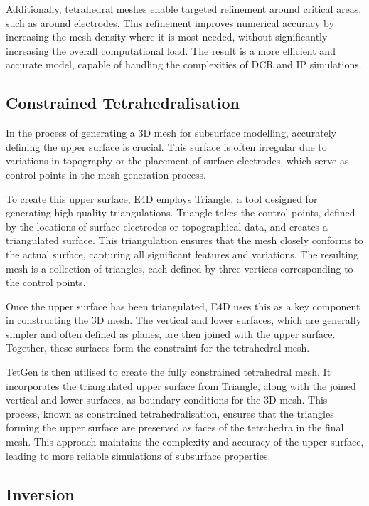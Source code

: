 \documentclass[a4paper,12pt]{article}
\begin{document}
Additionally, tetrahedral meshes enable targeted refinement around critical areas, such as around electrodes. This refinement improves numerical accuracy by increasing the mesh density where it is most needed, without significantly increasing the overall computational load. The result is a more efficient and accurate model, capable of handling the complexities of DCR and IP simulations.

\subsection{Constrained Tetrahedralisation}

In the process of generating a 3D mesh for subsurface modelling, accurately defining the upper surface is crucial. This surface is often irregular due to variations in topography or the placement of surface electrodes, which serve as control points in the mesh generation process.

To create this upper surface, E4D employs Triangle, a tool designed for generating high-quality triangulations. Triangle takes the control points, defined by the locations of surface electrodes or topographical data, and creates a triangulated surface. This triangulation ensures that the mesh closely conforms to the actual surface, capturing all significant features and variations. The resulting mesh is a collection of triangles, each defined by three vertices corresponding to the control points.

Once the upper surface has been triangulated, E4D uses this as a key component in constructing the 3D mesh. The vertical and lower surfaces, which are generally simpler and often defined as planes, are then joined with the upper surface. Together, these surfaces form the constraint for the tetrahedral mesh.

TetGen is then utilised to create the fully constrained tetrahedral mesh. It incorporates the triangulated upper surface from Triangle, along with the joined vertical and lower surfaces, as boundary conditions for the 3D mesh. This process, known as constrained tetrahedralisation, ensures that the triangles forming the upper surface are preserved as faces of the tetrahedra in the final mesh. This approach maintains the complexity and accuracy of the upper surface, leading to more reliable simulations of subsurface properties.


\subsection{Inversion}
\end{document}
